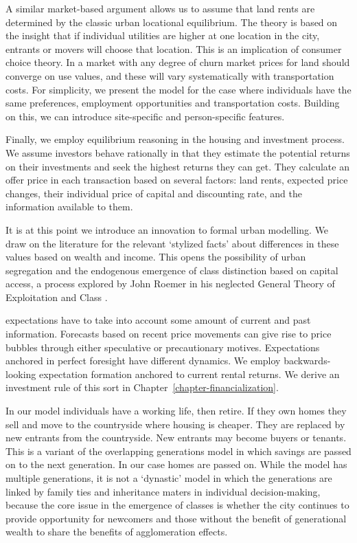 A similar market-based argument allows us to assume that land rents are determined by the classic urban locational equilibrium. The theory is based on the insight that if individual utilities are higher at one location in the city, entrants or movers will choose that  location. This is an implication of consumer choice theory. In a market with any degree of churn market prices for land should converge on use values, and these will vary systematically with transportation costs. For simplicity, we present the model for the case where individuals have the same preferences, employment opportunities and transportation costs. Building on this, %
we can introduce site-specific and person-specific features. 

Finally, we employ \gls{equilibrium reasoning} in the housing and investment process. We assume investors behave rationally in that they estimate the potential returns on their investments and seek the highest returns they can get. They calculate an offer price in each transaction based on several factors: land rents, expected price changes, their individual price of capital and discounting rate, and the information available to them.

It is at this point we introduce an innovation to formal urban modelling. We draw on the literature for the relevant `\gls{stylized facts}' about differences in these values based on wealth and income. This opens the possibility of urban segregation and the endogenous emergence of class distinction based on capital access, a process explored by John Roemer in his neglected General Theory of Exploitation and Class \cite{roemerGeneralTheoryExploitation1982}.  

\Gls{expectations} have to take into account some amount of current and past information. Forecasts based on recent price movements can give rise to price bubbles through either speculative or precautionary motives. Expectations anchored in \gls{perfect foresight} have different dynamics. We employ backwards-looking expectation formation anchored to current rental returns. We derive an investment rule of this sort in Chapter~\ref{chapter-financialization}. 
          
In our model individuals have a working life, then retire. If they own homes they sell and move to the countryside where housing is cheaper. They are replaced by new entrants from the countryside. New entrants may become buyers or tenants. This is a variant of the overlapping generations  model in which savings are passed on to the next generation. In our case homes are passed on. While the model has multiple generations, it is not a `dynastic' model in which the generations are linked by family ties and inheritance maters in individual decision-making, because the core issue in the emergence of classes is whether the city continues to provide opportunity for newcomers and those without the benefit of generational wealth to share the  benefits of agglomeration effects. %

